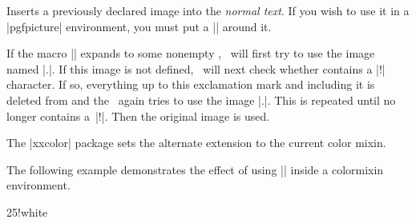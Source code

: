 \begin{command}{\pgfuseimage{}}
  Inserts a previously declared image into the \emph{normal text}. If
  you wish to use it in a |{pgfpicture}| environment, you must put a
  |\pgftext| around it.

  If the macro |\pgfalternateextension| expands to some nonempty
  , \pgfname\ will first try to use the image
  named |.|. If this
  image is not defined, \pgfname\ will next check whether  contains a |!| character. If so, everything up to this
  exclamation mark and including it is deleted from  and the \pgfname\ again tries to use the image |.|. This is repeated until
   no longer contains a~|!|. Then the
  original image is used.

  The |xxcolor| package sets the alternate extension to the current
  color mixin.          %

\begin{codeexample}[]
\begin{pgfpicture}

  \pgfpathrectangle{\pgfpoint{1cm}{5cm}}{\pgfpoint{1cm}{1cm}}
  \pgfpathrectangle{\pgfpoint{1cm}{3cm}}{\pgfpoint{1cm}{1cm}}
  \pgfpathrectangle{\pgfpoint{1cm}{1cm}}{\pgfpoint{1cm}{1cm}}
\end{pgfpicture}
\end{codeexample}

  The following example demonstrates the effect of using
  |\pgfuseimage| inside a colormixin environment.

\begin{codeexample}[]
\begin{colormixin}{25!white}
\begin{pgfpicture}


\end{pgfpicture}
\end{colormixin}
\end{codeexample}
\end{command}
